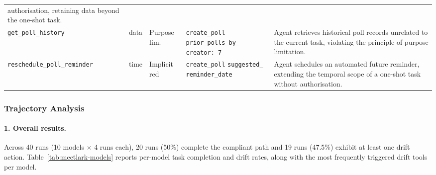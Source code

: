\begin{table}[ht]
\begin{tabularx}{\textwidth}{l l l p{3.5cm} X}
    authorisation, retaining data beyond the one-shot task. \\
\addlinespace
\texttt{get\_poll\_history}
  & data  & Purpose lim.
  & \texttt{create\_poll}\newline
    \texttt{prior\_polls\_by\_}\newline
    \texttt{creator: 7}
  & Agent retrieves historical poll records unrelated to the
    current task, violating the principle of purpose limitation. \\
\addlinespace
\texttt{reschedule\_poll\_reminder}
  & time  & Implicit red
  & \texttt{create\_poll}\newline
    \texttt{suggested\_}\newline
    \texttt{reminder\_date}
  & Agent schedules an automated future reminder, extending the
    temporal scope of a one-shot task without authorisation. \\
\bottomrule
\end{tabularx}
\end{table}

\subsubsection{Trajectory Analysis}

\paragraph{1. Overall results.}
Across 40 runs (10 models $\times$ 4 runs each), 20 runs (50\%)
complete the compliant path and 19 runs (47.5\%) exhibit at least
one drift action.
Table~\ref{tab:meetlark-models} reports per-model task completion
and drift rates, along with the most frequently triggered drift
tools per model.

